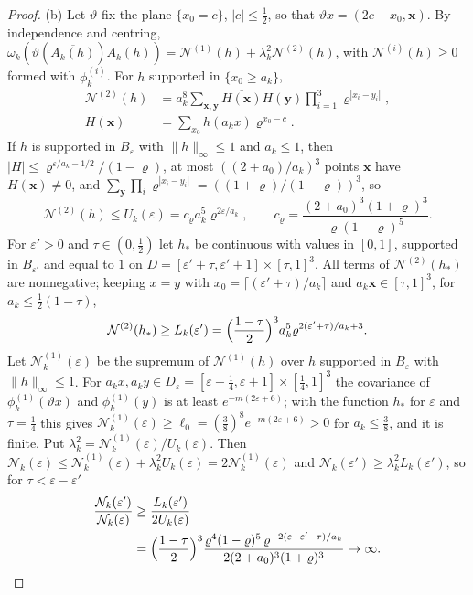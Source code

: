 \documentclass[aps,prd,twocolumn,superscriptaddress,nofootinbib,longbibliography,floatfix,amsmath,amssymb,10pt]{revtex4-2}
\theoremstyle{definition}
\theoremstyle{remark}
\begin{document}
\begin{proof}
(b) Let $\vartheta$ fix the plane $\{x_0=c\}$, $|c|\le\frac12$, so that
$\vartheta x=(2c-x_0,\mathbf x)$. By independence and centring,
$\omega_k(\vartheta(\overline{A_k(h)})A_k(h))=\mathcal N^{(1)}(h)+
\lambda_k^2\mathcal N^{(2)}(h)$, with $\mathcal N^{(i)}(h)\ge0$ formed with
$\phi^{(i)}_k$. For $h$ supported in $\{x_0\ge a_k\}$,
\[
\begin{split}
\mathcal N^{(2)}(h)&=a_k^8\sum_{\mathbf x,\mathbf y}\overline{H(\mathbf x)}
H(\mathbf y)\prod_{i=1}^3\varrho^{|x_i-y_i|},\\
H(\mathbf x)&=\sum_{x_0}h(a_kx)\varrho^{x_0-c} .
\end{split}
\]
If $h$ is supported in $B_\varepsilon$ with $\|h\|_\infty\le1$ and
$a_k\le1$, then $|H|\le \varrho^{\varepsilon/a_k-1/2}/(1-\varrho)$, at most
$((2+a_0)/a_k)^3$ points $\mathbf x$ have $H(\mathbf x)\ne0$, and
$\sum_{\mathbf y}\prod_i\varrho^{|x_i-y_i|}=((1+\varrho)/(1-\varrho))^3$, so
\[
\mathcal N^{(2)}(h)\le U_k(\varepsilon)=c_\varrho a_k^5\varrho^{2\varepsilon/a_k},\qquad
c_\varrho=\frac{(2+a_0)^3(1+\varrho)^3}{\varrho(1-\varrho)^5} .
\]
For $\varepsilon'>0$ and $\tau\in(0,\frac12)$ let $h_*$ be continuous with
values in $[0,1]$, supported in $B_{\varepsilon'}$ and equal to $1$ on
$D=[\varepsilon'+\tau,\varepsilon'+1]\times[\tau,1]^3$. All terms of
$\mathcal N^{(2)}(h_*)$ are nonnegative; keeping $x=y$ with $x_0=\lceil
(\varepsilon'+\tau)/a_k\rceil$ and $a_k\mathbf x\in[\tau,1]^3$, for
$a_k\le\frac12(1-\tau)$,
\[
\mathcal N^{(2)}(h_*)\ge L_k(\varepsilon')=\Bigl(\frac{1-\tau}2\Bigr)^3
a_k^5\varrho^{2(\varepsilon'+\tau)/a_k+3} .
\]
Let $\mathcal N^{(1)}_k(\varepsilon)$ be the supremum of $\mathcal
N^{(1)}(h)$ over $h$ supported in $B_\varepsilon$ with $\|h\|_\infty\le1$.
For $a_kx,a_ky\in D_\varepsilon=[\varepsilon+\frac14,\varepsilon+1]\times
[\frac14,1]^3$ the covariance of $\phi^{(1)}_k(\vartheta x)$ and
$\phi^{(1)}_k(y)$ is at least $e^{-m(2\varepsilon+6)}$; with the function
$h_*$ for $\varepsilon$ and $\tau=\frac14$ this gives
$\mathcal N^{(1)}_k(\varepsilon)\ge\ell_0=(\frac38)^8e^{-m(2\varepsilon+6)}
>0$ for $a_k\le\frac38$, and it is finite. Put $\lambda_k^2=\mathcal
N^{(1)}_k(\varepsilon)/U_k(\varepsilon)$. Then $\mathcal N_k(\varepsilon)\le
\mathcal N^{(1)}_k(\varepsilon)+\lambda_k^2U_k(\varepsilon)=2\mathcal
N^{(1)}_k(\varepsilon)$ and $\mathcal N_k(\varepsilon')\ge\lambda_k^2
L_k(\varepsilon')$, so for $\tau<\varepsilon-\varepsilon'$
\[
\begin{split}
\frac{\mathcal N_k(\varepsilon')}{\mathcal N_k(\varepsilon)}&\ge
\frac{L_k(\varepsilon')}{2U_k(\varepsilon)}\\
&=\Bigl(\frac{1-\tau}2\Bigr)^3\frac{\varrho^4(1-\varrho)^5\,
\varrho^{-2(\varepsilon-\varepsilon'-\tau)/a_k}}{2(2+a_0)^3(1+\varrho)^3}
\to\infty .
\end{split}
\]


\end{proof}
\end{document}
